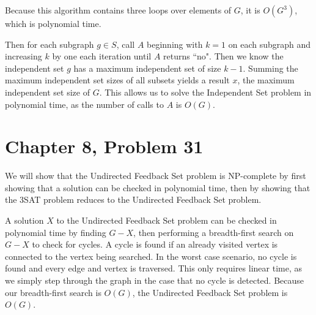 \documentclass[12pt]{article}
\begin{document}
Because this algorithm contains three loops over elements of \(G\), it is \(O(G^3)\), which is polynomial time.

Then for each subgraph \(g\in S\), call \(A\) beginning with \(k=1\) on each subgraph and increasing \(k\) by one
each iteration until \(A\) returns ``no". Then we know the independent set \(g\) has a maximum independent set of size
\(k-1\). Summing the maximum independent set sizes of all subsets yields a result \(x\), the maximum independent set size
of \(G\). This allows us to solve the Independent Set problem in polynomial time, as the number of calls to \(A\) is
\(O(G)\).

\pagebreak

\section*{Chapter 8, Problem 31}

We will show that the Undirected Feedback Set problem is NP-complete by first showing
that a solution can be checked in polynomial time, then by showing that the 3SAT problem reduces
to the Undirected Feedback Set problem.

A solution \(X\) to the Undirected Feedback Set problem can be checked in polynomial time by finding \(G-X\),
then performing a breadth-first search on \(G-X\) to check for cycles. A cycle is found if an already
visited vertex is connected to the vertex being searched. In the worst case scenario, no cycle is found and
every edge and vertex is traversed. This only requires linear time, as we simply step through the graph in the case
that no cycle is detected. Because our breadth-first search is \(O(G)\), the Undirected Feedback Set problem is \(O(G)\).
\end{document}
